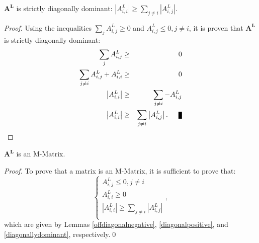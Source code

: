 \begin{lemma}\label{diagonallydominant}
   $\mathbf{A^L}$ is strictly diagonally dominant:
   $\left|A^L_{i,i}\right| \ge \sum\limits_{j\ne i} \left|A^L_{i,j}\right|$.
\end{lemma}
\begin{proof}
Using the inequalities $\sum\limits_j A^L_{i,j} \ge 0$ and $A^L_{i,j}\le 0, j\ne i$,
it is proven that $\mathbf{A^L}$ is strictly diagonally dominant:
\begin{eqnarray*}
	\sum\limits_j A^L_{i,j} & \ge & 0\\
	\sum\limits_{j\ne i} A^L_{i,j} + A^L_{i,i} & \ge & 0\\
	\left|A^L_{i,i}\right| & \ge & \sum\limits_{j\ne i} -A^L_{i,j}\\
	\left|A^L_{i,i}\right| & \ge & \sum\limits_{j\ne i} \left|A^L_{i,j}\right|.\qed
\end{eqnarray*}
\end{proof}

\begin{lemma}
   $\mathbf{A^L}$ is an M-Matrix.
\end{lemma}
\begin{proof}
To prove that a matrix is an M-Matrix, it is sufficient to prove that:
\[
\left\{\begin{array}{l}
A^L_{i,j}\le 0, j\ne i\\
A^L_{i,i}\ge 0\\
\left|A^L_{i,i}\right| \ge \sum\limits_{j\ne i} \left|A^L_{i,j}\right|\\
\end{array}
\right.,
\]
which are given by Lemmas \ref{offdiagonalnegative}, \ref{diagonalpositive}, and
\ref{diagonallydominant}, respectively.\qed
\end{proof}

